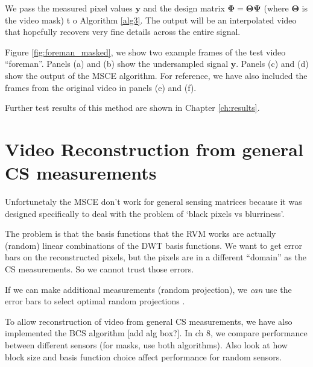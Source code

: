 We pass the measured pixel values $\bm y$ and the design matrix $\bm\Phi = \bm\Theta\bm\Psi$ (where $\bm\Theta$ is the video mask) t
o Algorithm \ref{alg3}.
The output will be an interpolated video that hopefully recovers very fine details across the entire signal.

Figure \ref{fig:foreman_masked}, we show two example frames of the test video ``foreman''.
Panels (a) and (b) show the undersampled signal $\bm y$.
Panels (c) and (d) show the output of the MSCE algorithm.
For reference, we have also included the frames from the original video in panels (e) and (f).

Further test results of this method are shown in Chapter \ref{ch:results}.

\section{Video Reconstruction from general CS measurements}
Unfortunetaly the MSCE don't work for general sensing matrices because it was designed specifically to deal with the problem of `black pixels vs blurriness'.

The problem is that the basis functions that the RVM works are actually (random) linear combinations of the DWT basis functions.
We want to get error bars on the reconstructed pixels, but the pixels are in a different ``domain'' as the CS measurements. 
So we cannot trust those errors.

If we can make additional measurements (random projection), we \emph{can} use the error bars to select optimal random projections \cite{ji2008}. 

To allow reconstruction of video from general CS measurements, we have also implemented the BCS algorithm [add alg box?].
In ch 8, we compare performance between different sensors (for masks, use both algorithms).
Also look at how block size and basis function choice affect performance for random sensors.